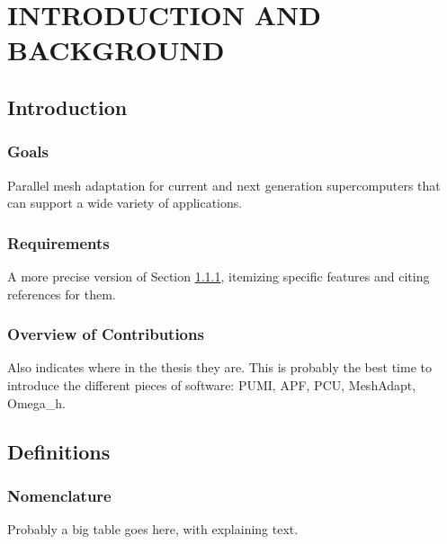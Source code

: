 
\chapter{INTRODUCTION AND BACKGROUND}
\label{chap:intro}

\section{Introduction}

\subsection{Goals}
\label{sec:intro_goals}

Parallel mesh adaptation for current and next generation supercomputers
that can support a wide variety of applications.

\subsection{Requirements}

A more precise version of Section \ref{sec:intro_goals},
itemizing specific features and citing references for them.

\subsection{Overview of Contributions}

Also indicates where in the thesis they are.
This is probably the best time to introduce the
different pieces of software: PUMI, APF, PCU, MeshAdapt, Omega\_h.

\section{Definitions}

\subsection{Nomenclature}

Probably a big table goes here, with explaining text.

